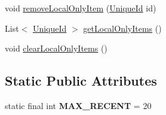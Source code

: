 \begin{DoxyCompactItemize}
\item 
void \hyperlink{classcom_1_1ualberta_1_1team17_1_1datamanager_1_1_user_context_ae2dee279277866c99d58e0b1572db9ba}{remove\+Local\+Only\+Item} (\hyperlink{classcom_1_1ualberta_1_1team17_1_1_unique_id}{Unique\+Id} id)
\item 
List$<$ \hyperlink{classcom_1_1ualberta_1_1team17_1_1_unique_id}{Unique\+Id} $>$ \hyperlink{classcom_1_1ualberta_1_1team17_1_1datamanager_1_1_user_context_ae290070479c2b1cc1cecf957e492d215}{get\+Local\+Only\+Items} ()
\item 
void \hyperlink{classcom_1_1ualberta_1_1team17_1_1datamanager_1_1_user_context_a42ae19cf9a3e1431a723663fae746200}{clear\+Local\+Only\+Items} ()
\end{DoxyCompactItemize}
\subsection*{Static Public Attributes}
\begin{DoxyCompactItemize}
\item 
\hypertarget{classcom_1_1ualberta_1_1team17_1_1datamanager_1_1_user_context_a5c3d11dfcca331640eb73def6f6304ee}{static final int {\bfseries M\+A\+X\+\_\+\+R\+E\+C\+E\+N\+T} = 20}\label{classcom_1_1ualberta_1_1team17_1_1datamanager_1_1_user_context_a5c3d11dfcca331640eb73def6f6304ee}

\end{DoxyCompactItemize}


